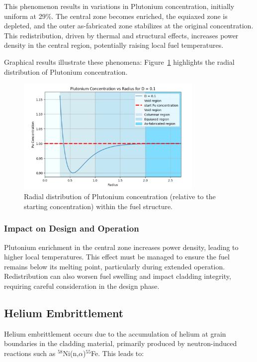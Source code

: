 \documentclass[11pt,a4paper,twoside]{article}
\begin{document}
This phenomenon results in variations in Plutonium concentration, initially uniform at 29\%. The central zone becomes enriched, the equiaxed zone is depleted, and the outer as-fabricated zone stabilizes at the original concentration. This redistribution, driven by thermal and structural effects, increases power density in the central region, potentially raising local fuel temperatures.

Graphical results illustrate these phenomena: Figure~\ref{fig:Pu_Profile} highlights the radial distribution of Plutonium concentration.

\begin{figure}[H]
\centering
\includegraphics[width=0.8\textwidth]{Pu_redistribution_profile.jpg}
\caption{Radial distribution of Plutonium concentration (relative to the starting concentration) within the fuel structure.}
\label{fig:Pu_Profile}
\end{figure}

\subsubsection*{Impact on Design and Operation}
Plutonium enrichment in the central zone increases power density, leading to higher local temperatures. 
This effect must be managed to ensure the fuel remains below its melting point, particularly during extended operation. 
Redistribution can also worsen fuel swelling and impact cladding integrity, requiring careful consideration in the design phase.

\subsection{Helium Embrittlement}

Helium embrittlement occurs due to the accumulation of helium at grain boundaries in the cladding material, primarily produced by neutron-induced reactions such as $^{58}$Ni(n,$\alpha$)$^{55}$Fe. This leads to:
\end{document}
